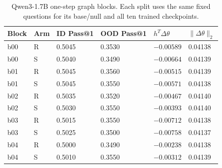 \begin{table}[H]
\caption{Qwen3-1.7B one-step graph blocks. Each split uses the same fixed questions for its base/null and all ten trained checkpoints.}
\label{tab:one-step-blocks-graph_unaudited}
\centering\small\setlength{\tabcolsep}{3pt}
\begin{tabular}{@{}llllll@{}}
\toprule
Block & Arm & ID Pass@1 & OOD Pass@1 & $h^T\Delta\theta$ & $\|\Delta\theta\|_2$\\
\midrule
b00 & R & 0.5045 & 0.3530 & $-0.00589$ & 0.04138\\
b00 & S & 0.5040 & 0.3490 & $-0.00664$ & 0.04139\\
b01 & R & 0.5045 & 0.3560 & $-0.00515$ & 0.04139\\
b01 & S & 0.5045 & 0.3550 & $-0.00571$ & 0.04138\\
b02 & R & 0.5035 & 0.3520 & $-0.00467$ & 0.04140\\
b02 & S & 0.5030 & 0.3550 & $-0.00393$ & 0.04140\\
b03 & R & 0.5015 & 0.3550 & $-0.00712$ & 0.04138\\
b03 & S & 0.5025 & 0.3500 & $-0.00758$ & 0.04137\\
b04 & R & 0.5000 & 0.3490 & $-0.00238$ & 0.04138\\
b04 & S & 0.5010 & 0.3550 & $-0.00312$ & 0.04139\\
\bottomrule
\end{tabular}
\end{table}

